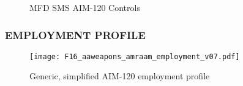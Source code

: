 \begin{figure}[htbp]
    \centering
    \caption{MFD SMS AIM-120 Controls}
\end{figure}

\clearpage
\clearpage

\subsubsection{EMPLOYMENT PROFILE}

\begin{figure}[h]
    \centering
    \texttt{[image: F16\_aaweapons\_amraam\_employment\_v07.pdf]}
    \caption{Generic, simplified AIM-120 employment profile}
    \label{fig:aa-weap:aim120:profile}
\end{figure}

